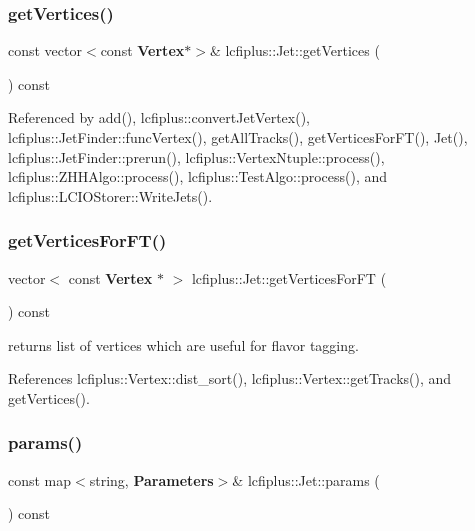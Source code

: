 \subsubsection{get\+Vertices()}
{\footnotesize\ttfamily const vector$<$const \textbf{ Vertex}$\ast$$>$\& lcfiplus\+::\+Jet\+::get\+Vertices (\begin{DoxyParamCaption}{ }\end{DoxyParamCaption}) const\hspace{0.3cm}{\ttfamily [inline]}}



Referenced by add(), lcfiplus\+::convert\+Jet\+Vertex(), lcfiplus\+::\+Jet\+Finder\+::func\+Vertex(), get\+All\+Tracks(), get\+Vertices\+For\+F\+T(), Jet(), lcfiplus\+::\+Jet\+Finder\+::prerun(), lcfiplus\+::\+Vertex\+Ntuple\+::process(), lcfiplus\+::\+Z\+H\+H\+Algo\+::process(), lcfiplus\+::\+Test\+Algo\+::process(), and lcfiplus\+::\+L\+C\+I\+O\+Storer\+::\+Write\+Jets().

\mbox{\label{classlcfiplus_1_1Jet_ae3e4148f23d95acad5b5921102aef6e6}} 
\subsubsection{get\+Vertices\+For\+F\+T()}
{\footnotesize\ttfamily vector$<$ const \textbf{ Vertex} $\ast$ $>$ lcfiplus\+::\+Jet\+::get\+Vertices\+For\+FT (\begin{DoxyParamCaption}{ }\end{DoxyParamCaption}) const}



returns list of vertices which are useful for flavor tagging. 



References lcfiplus\+::\+Vertex\+::dist\+\_\+sort(), lcfiplus\+::\+Vertex\+::get\+Tracks(), and get\+Vertices().

\mbox{\label{classlcfiplus_1_1Jet_a705740f1b6dd2535db81a7c1a694d6e3}} 
\subsubsection{params()}
{\footnotesize\ttfamily const map$<$string, \textbf{ Parameters}$>$\& lcfiplus\+::\+Jet\+::params (\begin{DoxyParamCaption}{ }\end{DoxyParamCaption}) const\hspace{0.3cm}{\ttfamily [inline]}}



